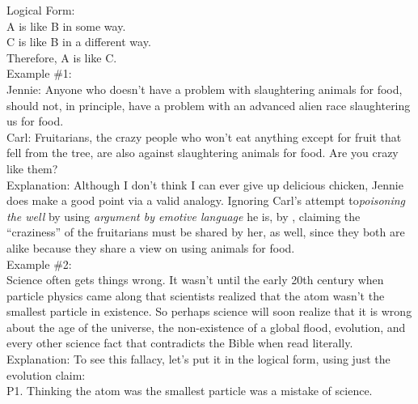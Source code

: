 \documentclass[a4paper,12pt,single,pdftex]{scrartcl}
\begin{document}
    
      Logical Form:
    \\

    
      A is like B in some way.
    \\

    
      C is like B in a different way.
    \\

    
      Therefore, A is like C.
    \\

    
      Example \#1:
    \\

    
      Jennie: Anyone who doesn’t have a problem with slaughtering animals for food, should not, in principle, have a problem with an advanced alien race slaughtering us for food.
    \\

    
      Carl: Fruitarians, the crazy people who won’t eat anything except for fruit that fell from the tree, are also against slaughtering animals for food.  Are you crazy like them?
    \\

    
      Explanation: Although I don’t think I can ever give up delicious chicken, Jennie does make a good point via a valid analogy.  Ignoring Carl’s attempt to{\it  poisoning the well }by using {\it argument by emotive language} he is, by{\it  
}, claiming the “craziness” of the fruitarians must be shared by her, as well, since they both are alike because they share a view on using animals for food.
    \\

    
      Example \#2:
    \\

    
      Science often gets things wrong.  It wasn’t until the early 20th century when particle physics came along that scientists realized that the atom wasn’t the smallest particle in existence.  So perhaps science will soon realize that it is wrong about the age of the universe, the non-existence of a global flood, evolution, and every other science fact that contradicts the Bible when read literally.
    \\

    
      Explanation: To see this fallacy, let’s put it in the logical form, using just the evolution claim:
    \\

    
      P1. Thinking the atom was the smallest particle was a mistake of science.
    \\
\end{document}
